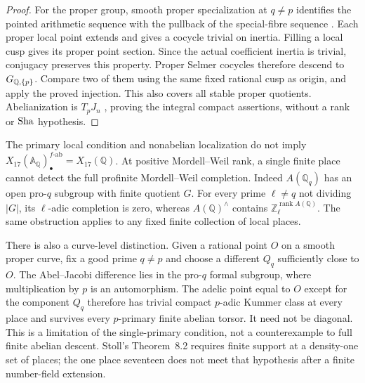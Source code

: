 \begin{proof}
For the proper group, smooth proper specialization at $q\ne p$
identifies the pointed arithmetic sequence with the pullback of
the special-fibre sequence
\citep[Expos\'e~X, Theorem~3.8 and Corollary~3.9, p.~217]{SGA1}.
Each proper local point extends and gives a cocycle trivial on
inertia. Filling a local cusp gives its proper point section.
Since the actual coefficient inertia is trivial, conjugacy preserves
this property. Proper Selmer cocycles therefore descend to
$G_{\mathbb Q,\{p\}}$. Compare two of them using the same fixed rational
cusp as origin, and apply the proved injection. This also covers
all stable proper quotients. Abelianization is $T_pJ_n$
\citep[Expos\'e~IX, \S5.8, p.~194]{SGA1}, proving the integral
compact assertions, without a rank or $\operatorname{Sha}$ hypothesis.
\end{proof}

\begin{remark}
\label{rem:regular-all-prime-limitation}
The primary local condition and nonabelian localization do not imply
$X_{17}(\mathbb A_{\mathbb Q})_\bullet^{f\text{-}\mathrm{ab}}
=X_{17}(\mathbb Q)$.  At positive Mordell--Weil rank, a
single finite place cannot detect the full profinite
Mordell--Weil completion.  Indeed $A(\mathbb Q_q)$ has an
open pro-$q$ subgroup with finite quotient $G$.  For every
prime $\ell\ne q$ not dividing $|G|$, its $\ell$-adic
completion is zero, whereas $A(\mathbb Q)^{\wedge}$ contains
$\mathbb Z_\ell^{\operatorname{rank}A(\mathbb Q)}$.
The same obstruction applies to any fixed finite collection
of local places.

There is also a curve-level distinction.  Given a rational
point $O$ on a smooth proper curve, fix a good prime $q\ne p$
and choose a different $Q_q$ sufficiently close to $O$.
The Abel--Jacobi difference lies in the pro-$q$ formal
subgroup, where multiplication by $p$ is an automorphism.
The adelic point equal to $O$ except for the component $Q_q$
therefore has trivial compact $p$-adic Kummer class at every
place and survives every $p$-primary finite abelian torsor.
It need not be diagonal.  This is a limitation of the
single-primary condition, not a counterexample to full
finite abelian descent.  Stoll's Theorem~8.2 requires finite
support at a density-one set of places; the one place
seventeen does not meet that hypothesis after a finite
number-field extension.
\end{remark}

